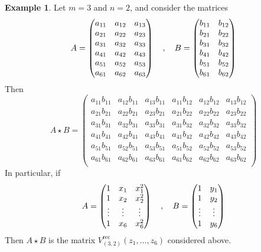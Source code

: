 \documentclass[a4paper,10pt]{amsart}
\theoremstyle{definition}
\newtheorem{example}[thm]{Example}
\theoremstyle{remark}
\numberwithin{equation}{section}
\newcommand{\0}{\color{blue}{\mathsf{0}}}
\begin{document}
 \begin{example} Let $m=3$ and $n=2$, and consider the matrices
\[ A= \begin{pmatrix}
a_{11}   &   a_{12}   & a_{13}    \\ 
a_{21}   &   a_{22}    & a_{23}  \\
a_{31}  &   a_{32}      &a_{33} \\
a_{41}   &   a_{42} & a_{43} \\
a_{51}   &   a_{52} & a_{53} \\
a_{61}   &   a_{62} & a_{63}     
\end{pmatrix} 
\\  \quad , \quad B= \begin{pmatrix}
b_{11}  &    b_{12}    \\ 
b_{21}  &    b_{22}     \\
b_{31}  &     b_{32}    \\
b_{41}  &     b_{42}    \\
b_{51}  &     b_{52}    \\
b_{61}  &     b_{62}    
\end{pmatrix} 
\]
Then 
\[ A\star B = 
\begin{pmatrix}
a_{11}b_{11}  &   a_{12} b_{11}    & a_{13} b_{11}   & a_{11}b_{12}  &   a_{12} b_{12} &  a_{13} b_{12}  \\ 
a_{21}b_{21}  &   a_{22} b_{21}   & a_{23} b_{21}  & a_{21}b_{22}  &   a_{22} b_{22}   &  a_{23} b_{22}  \\
a_{31}b_{31}  &   a_{32} b_{31}   & a_{33} b_{31}  & a_{31}b_{32}  &   a_{32} b_{32} &   a_{33} b_{32}   \\
a_{41}b_{41}  &   a_{42} b_{41}    & a_{43} b_{41} & a_{41}b_{42}  &   a_{42} b_{42}  & a_{43} b_{42}   \\
a_{51}b_{51}  &   a_{52} b_{51}    & a_{53} b_{51} & a_{51}b_{52}  &   a_{52} b_{52}  & a_{53} b_{52}   \\
a_{61}b_{61}  &   a_{62} b_{61}    & a_{63} b_{61} & a_{61}b_{62}  &   a_{62} b_{62}  & a_{63} b_{62}   \\
\end{pmatrix} 
 \]
In particular, if 
\[ A= \begin{pmatrix}
1  &   x_1   & x_1^2  \\ 
1   &   x_2  & x_2^2  \\
\vdots  &   \vdots      &\vdots \\
1   &   x_6 & x_6^2     
\end{pmatrix} 
\\  \quad , \quad B= \begin{pmatrix}
1 &   y_1    \\ 
1  &    y_2     \\
\vdots  &   \vdots    \\
1  &     y_6
\end{pmatrix} 
\]
Then $A\star B$ is the matrix $V^{\mathrm{rec}}_{(3,2)}(z_1,\ldots, z_6)$ considered above. 
 \end{example} 
\end{document}
